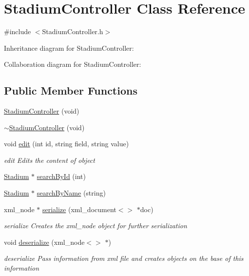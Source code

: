 \hypertarget{class_stadium_controller}{\section{Stadium\-Controller Class Reference}
\label{class_stadium_controller}
}


{\ttfamily \#include $<$Stadium\-Controller.\-h$>$}



Inheritance diagram for Stadium\-Controller\-:


Collaboration diagram for Stadium\-Controller\-:
\subsection*{Public Member Functions}
\begin{DoxyCompactItemize}
\item 
\hyperlink{class_stadium_controller_a17fe39afd3d93dbbdaf1cef027cdefaa}{Stadium\-Controller} (void)
\item 
\hyperlink{class_stadium_controller_a204dca10d15a0c911c7bbcce9aa648e1}{$\sim$\-Stadium\-Controller} (void)
\item 
void \hyperlink{class_stadium_controller_a73c220035ff25a16e3662a0266784218}{edit} (int id, string field, string value)
\begin{DoxyCompactList}\small\item\em edit Edits the content of object \end{DoxyCompactList}\item 
\hyperlink{class_stadium}{Stadium} $\ast$ \hyperlink{class_stadium_controller_a04c54a2b7396d3ef5667185a2f86edc6}{search\-By\-Id} (int)
\item 
\hyperlink{class_stadium}{Stadium} $\ast$ \hyperlink{class_stadium_controller_a1ef48e991575e837fd761d2eef0ce4a3}{search\-By\-Name} (string)
\item 
xml\-\_\-node $\ast$ \hyperlink{class_stadium_controller_a066f81b9560c8a7d92784ab85dd7a3b0}{serialize} (xml\-\_\-document$<$$>$ $\ast$doc)
\begin{DoxyCompactList}\small\item\em serialize Creates the xml\-\_\-node object for further serialization \end{DoxyCompactList}\item 
void \hyperlink{class_stadium_controller_af7e2ff3d41780e203e1bda88fdcd070a}{deserialize} (xml\-\_\-node$<$$>$ $\ast$)
\begin{DoxyCompactList}\small\item\em deserialize Pass information from xml file and creates objects on the base of this information \end{DoxyCompactList}\end{DoxyCompactItemize}
